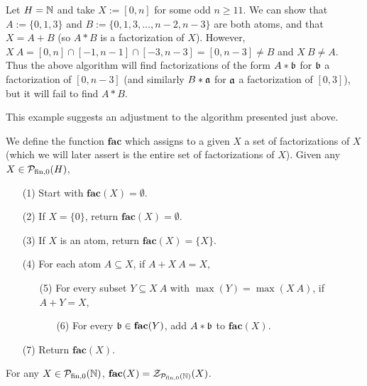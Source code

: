 \begin{eg}
	Let $H = \NN$ and take $X := [ 0,n ]$ for some odd $n \ge 11$.
	We can show that $A := \{0,1,3\}$ and $B := \{0,1,3,\dots,n-2,n-3\}$ are both atoms, and that $X = A + B$ (so $A*B$ is a factorization of $X$).
	However, $X\:A = [ 0,n ] \cap [ -1,n-1 ] \cap [ -3,n-3 ] = [ 0,n-3 ] \neq B$ and $X\: B \neq A$.
	Thus the above algorithm will find factorizations of the form $A*\bb$ for $\bb$ a factorization of $[ 0,n-3 ]$ (and similarly $B*\aa$ for $\aa$ a factorization of $[ 0,3 ]$), but it will fail to find $A*B$.
\end{eg} 

This example suggests an adjustment to the algorithm presented just above.

\begin{defn} \label{def:fac algorithm}
	We define the function $\mathbf{fac}$ which assigns to a given $X$ a set of factorizations of $X$ (which we will later assert is the entire set of factorizations of $X$).
	Given any $X\in \P_\fon(H)$,
	\begin{itemize}
		\item[(1)] Start with $\mathbf{fac}(X) = \emptyset$.
		\item[(2)] If $X = \{0\}$, return $\mathbf{fac}(X) = \emptyset$.
		\item[(3)] If $X$ is an atom, return $\mathbf{fac}(X) = \{X\}$. 
		\item[(4)] For each atom $A \subseteq X$, if $A + X\:A = X$,
		\begin{itemize}
			\item[(5)] For every subset $Y \subseteq X\:A$ with $\max(Y) = \max(X\:A)$, if $A+Y = X$,
			\begin{itemize}
				\item[(6)] For every $\bb\in \mathbf{fac}(Y)$, add $A*\bb$ to $\mathbf{fac}(X)$.
			\end{itemize}
		\end{itemize}
		\item[(7)] Return $\mathbf{fac}(X)$.
	\end{itemize}
\end{defn}

\begin{prop}
	For any $X\in \PN$, $\mathbf{fac}(X) = \Z_{\PN}(X)$.
\end{prop}

